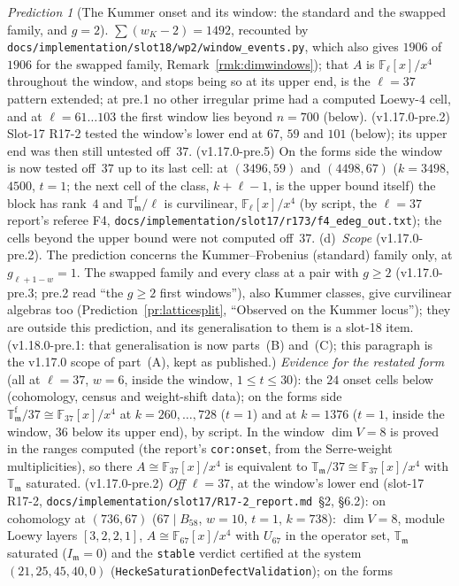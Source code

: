 \documentclass[11pt]{article}
\theoremstyle{remark}
\newtheorem{prediction}[theorem]{Prediction}
\newcommand{\F}{\mathbb{F}}
\newcommand{\Fl}{\F_\ell}
\newcommand{\T}{\mathbb{T}}
\newcommand{\m}{\mathfrak{m}}
\begin{document}
\begin{prediction}[The Kummer onset and its window: the standard and the swapped family, and $g=2$]
$\sum(w_K-2)=1492$, recounted by \texttt{docs/implementation/slot18/wp2/window\_events.py}, which also gives $1906$ of $1906$ for the swapped family,
Remark~\ref{rmk:dimwindows});
that $A$ is $\Fl[x]/x^4$ throughout the window, and stops being so at its upper end, is the $\ell=37$ pattern extended; at pre.1 no other irregular prime had a computed
Loewy-$4$ cell, and at $\ell=61\ldots103$ the first window lies beyond $n=700$ (below). (v1.17.0-pre.2) Slot-17 R17-2 tested the window's lower end at $67$,
$59$ and $101$ (below); its upper end was then still untested off~$37$. (v1.17.0-pre.5) On the forms side the window is now tested off~$37$ up to its last
cell: at $(3496,59)$ and $(4498,67)$ ($k=3498$, $4500$, $t=1$; the next cell of the class, $k+\ell-1$, is the upper bound itself) the block has rank~$4$ and
$\T^{\mathrm f}_\m/\ell$ is curvilinear, $\Fl[x]/x^4$ (by script, the $\ell=37$ report's referee F4,
\texttt{docs/implementation/slot17/r173/f4\_edeg\_out.txt}); the cells beyond the upper bound were not computed off~$37$. (d)~\emph{Scope} (v1.17.0-pre.2). The prediction concerns the Kummer--Frobenius (standard)
family only, at $g_{\ell+1-w}=1$. The swapped family and every class at a pair with $g\ge2$ (v1.17.0-pre.3; pre.2 read ``the $g\ge2$ first windows''), also Kummer classes, give curvilinear algebras too (Prediction~\ref{pr:latticesplit}, ``Observed
on the Kummer locus''); they are outside this prediction, and its generalisation to them is a slot-18 item. (v1.18.0-pre.1: that generalisation is now parts~(B)
and~(C); this paragraph is the v1.17.0 scope of part~(A), kept as published.)
\emph{Evidence for the restated form} (all at $\ell=37$, $w=6$, inside the window, $1\le t\le30$): the $24$ onset cells below (cohomology, census and
weight-shift data); on the forms side $\T^{\mathrm f}_\m/37\cong\F_{37}[x]/x^4$ at $k=260,\dots,728$ ($t=1$) and at $k=1376$ ($t=1$, inside the window,
$36$ below its upper end), by script. In the window $\dim V=8$ is proved in the ranges computed (the report's \texttt{cor:onset}, from the Serre-weight
multiplicities), so there $A\cong\F_{37}[x]/x^4$ is equivalent to $\T_\m/37\cong\F_{37}[x]/x^4$ with $\T_\m$ saturated.
(v1.17.0-pre.2) \emph{Off $\ell=37$}, at the window's lower end (slot-17 R17-2, \texttt{docs/implementation/slot17/R17-2\_report.md}~\S2, \S6.2): on cohomology
at $(736,67)$ ($67\mid B_{58}$, $w=10$, $t=1$, $k=738$): $\dim V=8$, module Loewy layers $[3,2,2,1]$, $A\cong\F_{67}[x]/x^4$ with $U_{67}$ in the operator set,
$\T_\m$ saturated ($I_\m=0$) and the \texttt{stable} verdict certified at the system $(21,25,45,40,0)$ (\texttt{HeckeSaturationDefectValidation}); on the forms

\end{prediction}
\end{document}
